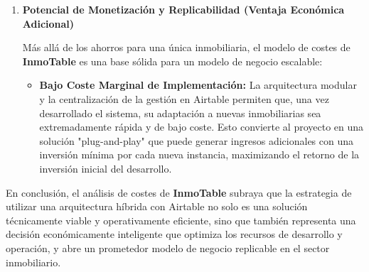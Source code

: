\begin{enumerate}
    \item \textbf{Potencial de Monetización y Replicabilidad (Ventaja Económica Adicional)}
    
    Más allá de los ahorros para una única inmobiliaria, el modelo de costes de \textbf{InmoTable} es una base sólida para un modelo de negocio escalable:

    \begin{itemize}
        \item \textbf{Bajo Coste Marginal de Implementación:} La arquitectura modular y la centralización de la gestión en Airtable permiten que, una vez desarrollado el sistema, su adaptación a nuevas inmobiliarias sea extremadamente rápida y de bajo coste. Esto convierte al proyecto en una solución "plug-and-play" que puede generar ingresos adicionales con una inversión mínima por cada nueva instancia, maximizando el retorno de la inversión inicial del desarrollo.
    \end{itemize}
    
\end{enumerate}

En conclusión, el análisis de costes de \textbf{InmoTable} subraya que la estrategia de utilizar una arquitectura híbrida con Airtable no solo es una solución técnicamente viable y operativamente eficiente, sino que también representa una decisión económicamente inteligente que optimiza los recursos de desarrollo y operación, y abre un prometedor modelo de negocio replicable en el sector inmobiliario.


